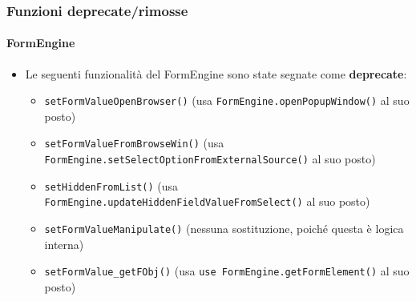 \begin{frame}[fragile]
	\frametitle{Funzioni deprecate/rimosse}
	\framesubtitle{FormEngine}

	\lstset{basicstyle=\tiny\ttfamily}

	\begin{itemize}
		\item Le seguenti funzionalità del FormEngine sono state segnate come \textbf{deprecate}:

			\begin{itemize}
				\item \texttt{setFormValueOpenBrowser()}\newline
					\smaller(usa \texttt{FormEngine.openPopupWindow()} al suo posto)\small

				\item \texttt{setFormValueFromBrowseWin()}\newline
					\smaller(usa \texttt{FormEngine.setSelectOptionFromExternalSource()} al suo posto)\small

				\item \texttt{setHiddenFromList()}\newline
					\smaller(usa \texttt{FormEngine.updateHiddenFieldValueFromSelect()} al suo posto)\small

				\item \texttt{setFormValueManipulate()}\newline
					\smaller(nessuna sostituzione, poiché questa è logica interna)\small

				\item \texttt{setFormValue\_getFObj()}\newline
					\smaller(usa \texttt{use FormEngine.getFormElement()} al suo posto)\small

			\end{itemize}

	\end{itemize}

\end{frame}



